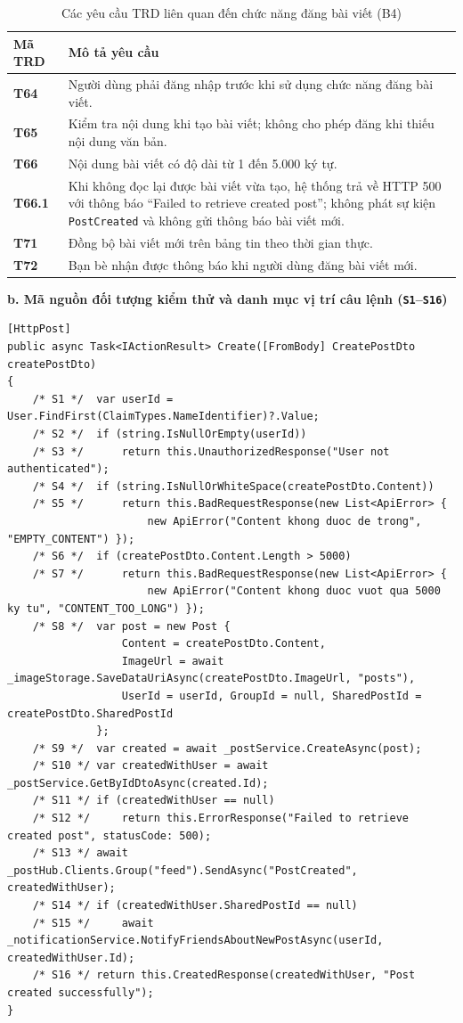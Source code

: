\documentclass[11pt,a4paper]{article}
\begin{document}
\begin{table}[H]
\centering
\small
\begin{tabularx}{\textwidth}{|C{1.8cm}|X|}
\hline
{}
\textbf{Mã TRD} & \textbf{Mô tả yêu cầu} \tabularnewline
\hline
\textbf{T64} & Người dùng phải đăng nhập trước khi sử dụng chức năng đăng bài viết. \\ \hline
\textbf{T65} & Kiểm tra nội dung khi tạo bài viết; không cho phép đăng khi thiếu nội dung văn bản. \\ \hline
\textbf{T66} & Nội dung bài viết có độ dài từ 1 đến 5.000 ký tự. \\ \hline
\textbf{T66.1} & Khi không đọc lại được bài viết vừa tạo, hệ thống trả về HTTP 500 với thông báo ``Failed to retrieve created post''; không phát sự kiện \texttt{PostCreated} và không gửi thông báo bài viết mới. \\ \hline
\textbf{T71} & Đồng bộ bài viết mới trên bảng tin theo thời gian thực. \\ \hline
\textbf{T72} & Bạn bè nhận được thông báo khi người dùng đăng bài viết mới. \\ \hline
\end{tabularx}
\caption{Các yêu cầu TRD liên quan đến chức năng đăng bài viết (B4)}
\end{table}

\noindent\textbf{b. Mã nguồn đối tượng kiểm thử và danh mục vị trí câu lệnh (\texttt{S1}--\texttt{S16})}
\begin{lstlisting}[language={[Sharp]C}]
[HttpPost]
public async Task<IActionResult> Create([FromBody] CreatePostDto createPostDto)
{
    /* S1 */  var userId = User.FindFirst(ClaimTypes.NameIdentifier)?.Value;
    /* S2 */  if (string.IsNullOrEmpty(userId))
    /* S3 */      return this.UnauthorizedResponse("User not authenticated");
    /* S4 */  if (string.IsNullOrWhiteSpace(createPostDto.Content))
    /* S5 */      return this.BadRequestResponse(new List<ApiError> {
                      new ApiError("Content khong duoc de trong", "EMPTY_CONTENT") });
    /* S6 */  if (createPostDto.Content.Length > 5000)
    /* S7 */      return this.BadRequestResponse(new List<ApiError> {
                      new ApiError("Content khong duoc vuot qua 5000 ky tu", "CONTENT_TOO_LONG") });
    /* S8 */  var post = new Post {
                  Content = createPostDto.Content,
                  ImageUrl = await _imageStorage.SaveDataUriAsync(createPostDto.ImageUrl, "posts"),
                  UserId = userId, GroupId = null, SharedPostId = createPostDto.SharedPostId
              };
    /* S9 */  var created = await _postService.CreateAsync(post);
    /* S10 */ var createdWithUser = await _postService.GetByIdDtoAsync(created.Id);
    /* S11 */ if (createdWithUser == null)
    /* S12 */     return this.ErrorResponse("Failed to retrieve created post", statusCode: 500);
    /* S13 */ await _postHub.Clients.Group("feed").SendAsync("PostCreated", createdWithUser);
    /* S14 */ if (createdWithUser.SharedPostId == null)
    /* S15 */     await _notificationService.NotifyFriendsAboutNewPostAsync(userId, createdWithUser.Id);
    /* S16 */ return this.CreatedResponse(createdWithUser, "Post created successfully");
}
\end{lstlisting}
\end{document}
